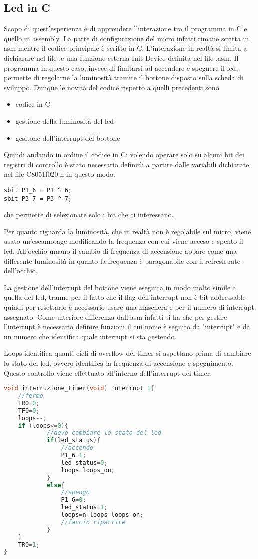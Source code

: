 \documentclass[main.tex]{subfiles}
\begin{document}
\subsection{Led in C}\label{led in C}
Scopo di quest'esperienza è di apprendere l'interazione tra il programma in C e quello in assembly. La parte di configurazione del micro infatti rimane scritta in asm mentre il codice principale è scritto in C. L'interazione in realtà si limita a dichiarare nel file .c una funzione esterna Init Device definita nel file .asm. Il programma in questo caso, invece di limitarsi ad accendere e spegnere il led, permette di regolarne la luminosità tramite il bottone disposto sulla scheda di sviluppo. Dunque le novità del codice rispetto a quelli precedenti sono 
\begin{itemize}
    \item codice in C
    \item gestione della luminosità del led
    \item gesitone dell'interrupt del bottone
\end{itemize}

Quindi andando in ordine il codice in C: volendo operare solo su alcuni bit dei registri di controllo è stato necessario definirli a partire dalle variabili dichiarate nel file C8051f020.h in questo modo:
\begin{lstlisting}
sbit P1_6 = P1 ^ 6;
sbit P3_7 = P3 ^ 7;
\end{lstlisting}
che permette di selezionare solo i bit che ci interessano. 

Per quanto riguarda la luminosità, che in realtà non è regolabile sul micro, viene usato un'escamotage modificando la frequenza con cui viene acceso e spento il led. All'occhio umano il cambio di frequenza di accensione appare come una differente luminosità in quanto la frequenza è paragonabile con il refresh rate dell'occhio. 

La gestione dell'interrupt del bottone viene eseguita in modo molto simile a quella del led, tranne per il fatto che il flag dell'interrupt non è bit addressable quindi per resettarlo è necessario usare una maschera e per il numero di interrupt assegnato. 
Come ulteriore differenza dall'asm infatti si ha che per gestire l'interrupt è necessario definire funzioni il cui nome è seguito da "interrupt" e da un numero che identifica quale interrupt si sta gestendo. 

 Loops identifica quanti cicli di overflow del timer si aspettano prima di cambiare lo stato del led, ovvero identifica la frequenza di accensione e spegnimento. Questo controllo viene effettuato all'interno dell'interrupt del timer.
 \begin{lstlisting}[language=C,caption=Interrupt timer]
 void interruzione_timer(void) interrupt 1{
	//fermo
	TR0=0;
	TF0=0;
	loops--;
	if (loops<=0){
	        //devo cambiare lo stato del led
			if(led_status){
				//accendo
				P1_6=1;
				led_status=0;
				loops=loops_on;
			}
			else{
				//spengo
				P1_6=0;
				led_status=1;
				loops=n_loops-loops_on;
				//faccio ripartire
			}
	}
	TR0=1;
}
 \end{lstlisting}
 
\end{document}
